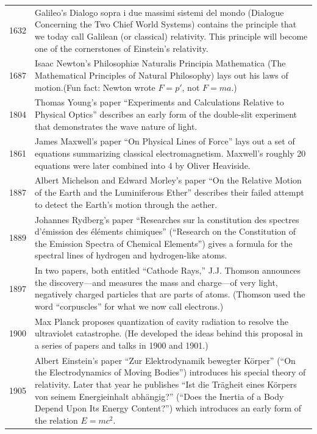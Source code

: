 \documentclass[../../../main.tex]{subfiles}
\begin{document}
\begin{center}
    \begin{longtable}{p{}  p{}}
    1632&Galileo's Dialogo sopra i due massimi sistemi del mondo (Dialogue Concerning the Two Chief World Systems) contains the principle that we today call Galilean (or classical) relativity. This principle will become one of the cornerstones of Einstein's relativity.\\
1687&Isaac Newton's Philosophiæ Naturalis Principia Mathematica (The Mathematical Principles of Natural  Philosophy) lays out his laws of motion.(Fun fact: Newton wrote $F = p'$, not $F = ma$.)\\
1804&Thomas Young's paper “Experiments and Calculations Relative to Physical Optics” describes an early form of the double-slit experiment that demonstrates the wave nature of light.\\
1861&James Maxwell's paper “On Physical Lines of Force” lays out a set of equations summarizing classical electromagnetism. Maxwell's roughly 20 equations were later combined into 4 by Oliver Heaviside.\\
1887&Albert Michelson and Edward Morley's paper “On the Relative Motion of the Earth and the Luminiferous Ether” describes their failed attempt to detect the Earth's motion through the aether.\\
1889&Johannes Rydberg's paper “Researches sur la constitution des spectres d'émission des éléments chimiques” (“Research on the Constitution of the Emission Spectra of Chemical Elements”) gives a formula for the spectral lines of hydrogen and hydrogen-like atoms.\\
1897&In two papers, both entitled “Cathode Rays,” J.J. Thomson announces the discovery—and measures the mass and charge—of very light, negatively charged particles that are parts of atoms. (Thomson used the word “corpuscles” for what we now call electrons.) \\
1900&Max Planck proposes quantization of cavity radiation to resolve the ultraviolet catastrophe. (He developed the ideas behind this proposal in a series of papers and talks in 1900 and 1901.)\\
1905&Albert Einstein's paper “Zur Elektrodynamik bewegter Körper” (“On the Electrodynamics of Moving Bodies”) introduces his special theory of relativity. Later that year he publishes “Ist die Trägheit eines Körpers von seinem Energieinhalt abhängig?” (“Does the Inertia of a Body Depend Upon Its Energy Content?”) which introduces an early form of the relation $E = mc^2$.\\

\end{longtable}
\end{center}
\end{document}
